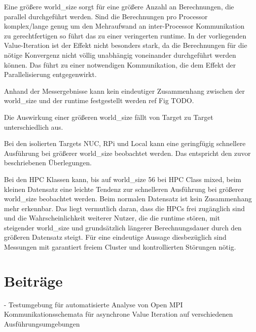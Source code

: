 Eine größere world\_size sorgt für eine größere Anzahl an Berechnungen, die parallel durchgeführt werden.
Sind die Berechnungen pro Processor komplex/lange genug um den Mehraufwand an inter-Processor Kommunikation zu
gerechtfertigen so führt das zu einer veringerten runtime.
In der vorliegenden Value-Iteration ist der Effekt nicht besonders stark, da die Berechnungen für die nötige
Konvergenz nicht völlig unabhängig voneinander durchgeführt werden können. Das führt zu einer notwendigen Kommunikation,
die dem Effekt der Parallelisierung entgegenwirkt.

Anhand der Messergebnisse kann kein eindeutiger Zusammenhang zwischen der world\_size und der runtime festgestellt werden ref Fig TODO.

Die Auswirkung einer größeren world\_size fällt von Target zu Target unterschiedlich aus.

Bei den isolierten Targets NUC, RPi und Local kann eine geringfügig schnellere Ausführung bei größerer world\_size beobachtet werden.
Das entspricht den zuvor beschriebenen Überlegungen.

Bei den HPC Klassen kann, bis auf world\_size 56 bei HPC Class mixed, beim kleinen Datensatz eine leichte Tendenz zur schnelleren
Ausführung bei größerer world\_size beobachtet werden. Beim normalen Datensatz ist kein Zusammenhang mehr erkennbar.
Das liegt vermutlich daran, dass die HPCs frei zugänglich sind und die Wahrscheinlichkeit weiterer Nutzer, die die runtime
stören, mit steigender world\_size und grundsätzlich längerer Berechnungsdauer durch den größeren Datensatz steigt.
Für eine eindeutige Aussage diesbezüglich sind Messungen mit garantiert freiem Cluster und kontrollierten Störungen nötig.

\section{Beiträge}
- Testumgebung für automatisierte Analyse von Open MPI Kommunikationsschemata für asynchrone Value Iteration auf verschiedenen Ausführungsumgebungen
